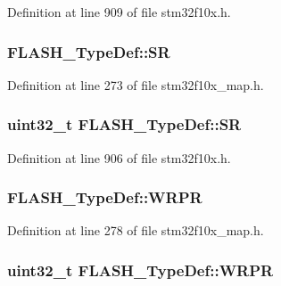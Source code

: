 Definition at line 909 of file stm32f10x.\+h.

\subsubsection[{\texorpdfstring{SR}{SR}}]{ F\+L\+A\+S\+H\+\_\+\+Type\+Def\+::\+SR}\hypertarget{struct_f_l_a_s_h___type_def_a83d84997ba34fe4ddf25146c85f29d5d}{}\label{struct_f_l_a_s_h___type_def_a83d84997ba34fe4ddf25146c85f29d5d}


Definition at line 273 of file stm32f10x\+\_\+map.\+h.

\subsubsection[{\texorpdfstring{SR}{SR}}]{ {\bf uint32\+\_\+t} F\+L\+A\+S\+H\+\_\+\+Type\+Def\+::\+SR}\hypertarget{struct_f_l_a_s_h___type_def_a52c4943c64904227a559bf6f14ce4de6}{}\label{struct_f_l_a_s_h___type_def_a52c4943c64904227a559bf6f14ce4de6}


Definition at line 906 of file stm32f10x.\+h.

\subsubsection[{\texorpdfstring{W\+R\+PR}{WRPR}}]{ F\+L\+A\+S\+H\+\_\+\+Type\+Def\+::\+W\+R\+PR}\hypertarget{struct_f_l_a_s_h___type_def_ace893d4b4de3834b67df1d3c1df8de48}{}\label{struct_f_l_a_s_h___type_def_ace893d4b4de3834b67df1d3c1df8de48}


Definition at line 278 of file stm32f10x\+\_\+map.\+h.

\subsubsection[{\texorpdfstring{W\+R\+PR}{WRPR}}]{ {\bf uint32\+\_\+t} F\+L\+A\+S\+H\+\_\+\+Type\+Def\+::\+W\+R\+PR}\hypertarget{struct_f_l_a_s_h___type_def_ac1889c0e17d868ab991f267ceb9dbb4b}{}\label{struct_f_l_a_s_h___type_def_ac1889c0e17d868ab991f267ceb9dbb4b}


